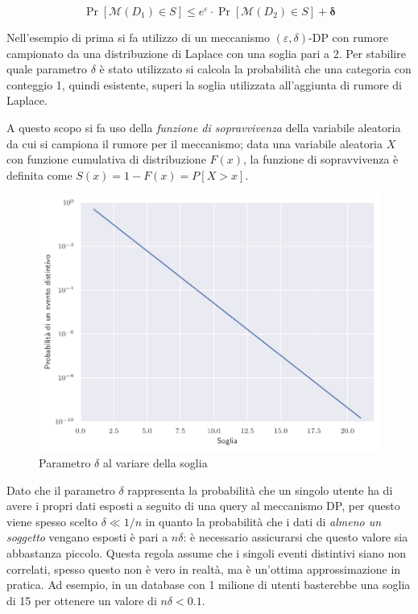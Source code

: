 \begin{equation}
    \Pr[\mathcal{M}(D_1) \in S] \le e^{\varepsilon} \cdot \Pr[\mathcal{M}(D_2) \in S] + \boldsymbol{\delta}
    \label{eq:ed_differential_privacy}
\end{equation}

Nell'esempio di prima si fa utilizzo di un meccanismo $(\varepsilon, \delta)$-DP con rumore campionato da una distribuzione di Laplace con una soglia pari a 2. Per stabilire quale parametro $\delta$ è stato utilizzato si calcola la probabilità che una categoria con conteggio 1, quindi esistente, superi la soglia utilizzata all'aggiunta di rumore di Laplace.

A questo scopo si fa uso della \textit{funzione di sopravvivenza} della variabile aleatoria da cui si campiona il rumore per il meccanismo; data una variabile aleatoria $X$ con funzione cumulativa di distribuzione $F(x)$, la funzione di sopravvivenza è definita come $S(x) = 1 - F(x) =  P[X > x]$.

\begin{figure}[H]
    \centering
    \includegraphics[width=.6\linewidth]{plots/threshold_probability.pdf}
    \caption{Parametro $\delta$ al variare della soglia}
\end{figure}

Dato che il parametro $\delta$ rappresenta la probabilità che un singolo utente ha di avere i propri dati esposti a seguito di una query al meccanismo DP, per questo viene spesso scelto $\delta \ll 1/n$ in quanto la probabilità che i dati di \textit{almeno un soggetto} vengano esposti è pari a $n\delta$: è necessario assicurarsi che questo valore sia abbastanza piccolo. Questa regola assume che i singoli eventi distintivi siano non correlati, spesso questo non è vero in realtà, ma è un'ottima approssimazione in pratica.
Ad esempio, in un database con 1 milione di utenti basterebbe una soglia di 15 per ottenere un valore di $n\delta < 0.1$.


